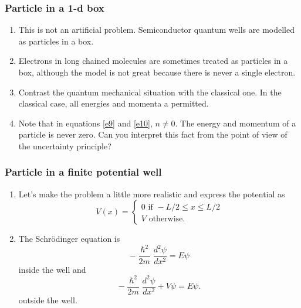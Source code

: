 \documentclass{beamer}
\begin{document}
\begin{frame}
\frametitle{Particle in a 1-d box}
\begin{enumerate}
\item This is not an artificial problem. Semiconductor quantum wells are 
modelled as particles in a box.
\item Electrons in long chained molecules are sometimes treated as particles in
a box, although the model is not great because there is never a single electron.
\item Contrast the quantum mechanical situation with the classical one. In
the classical case, all energies and momenta a permitted.
\item Note that in equations \eqref{e9} and \eqref{e10}, $n \ne 0$. The energy
and momentum of a particle is never zero. Can you interpret this fact from the
point of view of the uncertainty principle?
\end{enumerate}
\end{frame}

\begin{frame}
\frametitle{Particle in a finite potential well}
\begin{enumerate}
\item Let's make the problem a little more realistic and express the potential
as
\begin{equation}\label{e11}
V(x) = \begin{cases} 0 \text{ if } -L/2 \le x \le L/2 \\
 V \text{ otherwise.}
\end{cases}
\end{equation}
\item The Schr\"{o}dinger equation is
\begin{equation}\label{e12}
-\frac{\hslash^2}{2m}\frac{d^2\psi}{dx^2} = E\psi
\end{equation}
inside the well and
\begin{equation}\label{e13}
-\frac{\hslash^2}{2m}\frac{d^2\psi}{dx^2} + V\psi = E\psi.
\end{equation}
outside the well.
\end{enumerate}
\end{frame}
\end{document}
